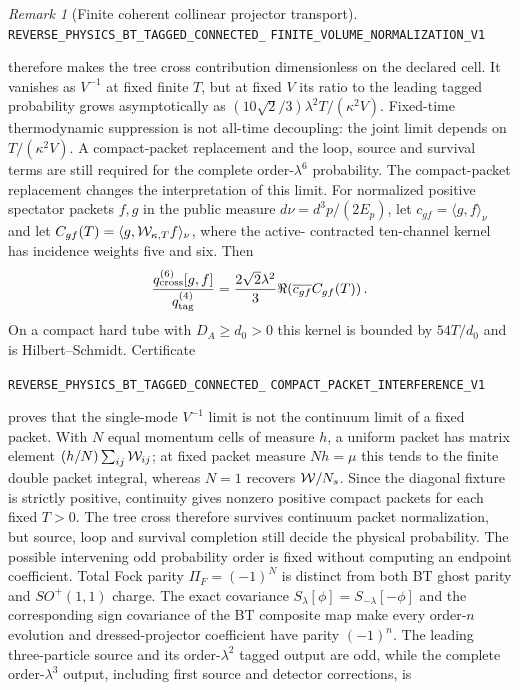 \documentclass[11pt]{article}
\theoremstyle{definition}
\theoremstyle{remark}
\newtheorem{remark}[theorem]{Remark}
\begin{document}
\begin{remark}[Finite coherent collinear projector transport]
\texttt{REVERSE\_PHYSICS\_BT\_TAGGED\_CONNECTED\_}
\allowbreak\texttt{FINITE\_VOLUME\_NORMALIZATION\_V1}
\par\noindent
therefore makes the tree cross contribution dimensionless on the declared
cell.  It vanishes as $V^{-1}$ at fixed finite $T$, but at fixed $V$ its
ratio to the leading tagged probability grows asymptotically as
$(10\sqrt2/3)\lambda^2T/(\kappa^2V)$.  Fixed-time thermodynamic suppression
is not all-time decoupling: the joint limit depends on
$T/(\kappa^2V)$.  A compact-packet replacement and the loop, source and
survival terms are still required for the complete order-$\lambda^6$
probability.
The compact-packet replacement changes the interpretation of this limit.
For normalized positive spectator packets $f,g$ in the public measure
$d\nu=d^3p/(2E_p)$, let $c_{gf}=\langle g,f\rangle_\nu$ and let
$C_{gf}(T)=\langle g,{\cal W}_{\kappa,T}f\rangle_\nu$, where the active-
contracted ten-channel kernel has incidence weights five and six.  Then
\[
 \frac{q_{\rm cross}^{(6)}[g,f]}{q_{\rm tag}^{(4)}}
 =\frac{2\sqrt2\lambda^2}{3}
 \Re\!\left(\overline{c_{gf}}C_{gf}(T)\right).
\]
On a compact hard tube with $D_A\geq d_0>0$ this kernel is bounded by
$54T/d_0$ and is Hilbert--Schmidt.  Certificate
\par\noindent
\texttt{REVERSE\_PHYSICS\_BT\_TAGGED\_CONNECTED\_}
\allowbreak\texttt{COMPACT\_PACKET\_INTERFERENCE\_V1}
\par\noindent
proves that the single-mode $V^{-1}$ limit is not the continuum limit of a
fixed packet.  With $N$ equal momentum cells of measure $h$, a uniform packet
has matrix element $(h/N)\sum_{ij}{\cal W}_{ij}$; at fixed packet measure
$Nh=\mu$ this tends to the finite double packet integral, whereas $N=1$
recovers ${\cal W}/N_s$.  Since the diagonal fixture is strictly positive,
continuity gives nonzero positive compact packets for each fixed $T>0$.  The
tree cross therefore survives continuum packet normalization, but source,
loop and survival completion still decide the physical probability.
The possible intervening odd probability order is fixed without computing an
endpoint coefficient.  Total Fock parity $\Pi_F=(-1)^N$ is distinct from both
BT ghost parity and $SO^+(1,1)$ charge.  The exact covariance
$S_\lambda[\phi]=S_{-\lambda}[-\phi]$ and the corresponding sign covariance
of the BT composite map make every order-$n$ evolution and dressed-projector
coefficient have parity $(-1)^n$.  The leading three-particle source and its
order-$\lambda^2$ tagged output are odd, while the complete
order-$\lambda^3$ output, including first source and detector corrections, is

\end{remark}
\end{document}
